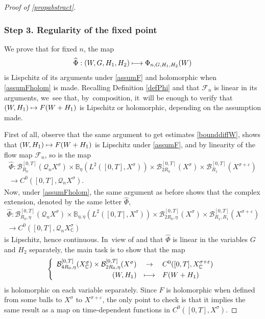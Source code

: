 \documentclass[10pt]{amsart}
\newcommand\mto{\mathchoice{\longmapsto}{\mapsto}{\mapsto}{\mapsto}}
\theoremstyle{definition}
\let\mc\mathcal
\let\veps\varepsilon
\newcommand{\B}{\mc{B}}
\newcommand{\Q}{\mathcal{Q}}
\newcommand\FL{\mathcal{F}_{n}}
\let\dpl\displaystyle
\begin{document}
\begin{proof}[Proof of \cref{propabstract}]
\subsubsection*{Step 3. Regularity of the fixed point} We prove that for fixed $n$, the map
\[
\widehat{\Phi}: (W, G, H_1, H_2)\mto \Phi_{n, G, H_1, H_2}(W)
\]
is Lispchitz of its arguments under \cref{assumF} and holomorphic when \cref{assumFholom} is made.
Recalling Definition \eqref{defPhi} and that $\FL$ is linear in its arguments, we~see that, by~composition, it~will be enough to verify that $(W,H_1)\mto F(W+H_{1})$ is Lipschitz or holomorphic, depending on the assumption made.

First of all, observe that the same argument to get estimates \eqref{bounddiffW}, shows that $(W,H_1)\mto F(W+H_{1})$ is Lipschitz under \cref{assumF}, and by linearity of the flow map $\mc{F}_n$, so is the map
\begin{multline*}
\widehat{\Phi}: \B_{R_0}^{[0, T]}(\Q_n X^{\sigma})\times \mathbb{B}_{\eta}(L^{2}([0,T],X^{\sigma}))\times \B_{2R_{0}}^{[0,T]}(X^{\sigma}) \times \B_{R_{1}}^{[0,T]}(X^{\sigma+\veps})\\
\to C^0([0, T], \Q_{n }X^{\sigma}).
\end{multline*}
Now, under \cref{assumFholom}, the same argument as before shows that the complex extension, denoted by the same letter $\widehat{\Phi}$,
\begin{multline*}
\widehat{\Phi}: \B_{R_0, \eta}^{[0, T]}(\Q_n X^{\sigma})\times \mathbb{B}_{\eta,\eta}(L^{2}([0,T],X^{\sigma}))\times \B_{2R_{0},\eta}^{[0,T]}(X^{\sigma}) \times \B_{R_{1}, R_{1}}^{[0,T]}(X^{\sigma+\veps})\\ \to C^0([0, T], \Q_{n }X_\mathbb{C}^{\sigma})
\end{multline*}
is Lipschitz, hence continuous. In~view of \cite[Prop.\,8.10]{Muj86} and that $\widehat{\Phi}$ is linear in the variables $G$ and $H_2$ separately, the main task is to show that the map
\begin{align}
\left\{\begin{array}{rcl}
\B_{4R_{0}, \eta}^{[0,T]}(X_{\mathbb{C}}^{\sigma}) \times \B_{2R_{0}, \eta}^{[0,T]}(X^{\sigma}) & \dpl\to& C^0([0, T], X_\mathbb{C}^{\sigma+\veps})\\[3pt]
(W, H_1 )&\dpl\mto& F(W+H_1)
\end{array}\right.
\end{align}
is holomorphic on each variable separately. Since $F$ is holomorphic when defined from some balls to $X^\sigma$ to $X^{\sigma+\veps}$, the only point to check is that it implies the same result as a map on time-dependent functions in $C^0([0,T],X^\sigma)$.


\end{proof}
\end{document}
